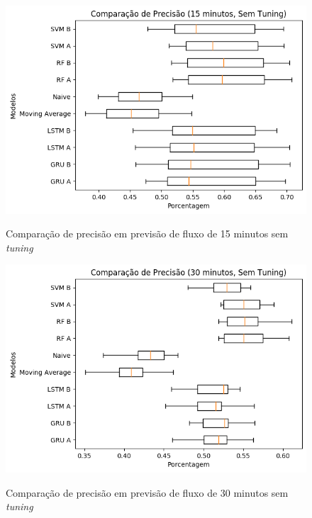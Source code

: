 \begin{figure}[htbp]
    \centering
    \includegraphics[scale=0.8]{monography/img/snapshots/comparacao_de_precisao_(15_minutos,_sem_tuning)_performance_boxes.png}
    \label{figure:comparacao_previsao_precisao_15_sem_tuning}
    \caption{Comparação de precisão em previsão de fluxo de 15 minutos sem \textit{tuning}}
\end{figure}

\begin{figure}[htbp]
    \centering
    \includegraphics[scale=0.8]{monography/img/snapshots/comparacao_de_precisao_(30_minutos,_sem_tuning)_performance_boxes.png}
    \label{figure:comparacao_previsao_precisao_30_sem_tuning}
    \caption{Comparação de precisão em previsão de fluxo de 30 minutos sem \textit{tuning}}
\end{figure}

